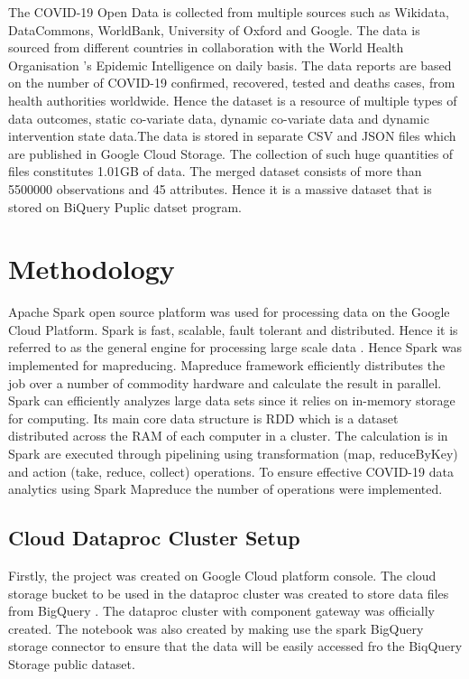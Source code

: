 \documentclass[12pt,letterpaper, twoside]{article}
\begin{document}
The COVID-19 Open Data is collected from multiple sources such as Wikidata, DataCommons, WorldBank, University of Oxford and Google. The data is sourced from different countries in collaboration with the World Health Organisation 's Epidemic Intelligence on daily basis. The data reports are based on the number of COVID-19  confirmed, recovered, tested and deaths cases, from health authorities worldwide. Hence the dataset is a resource of multiple types of data outcomes, static co-variate data, dynamic co-variate data and dynamic intervention state data\cite{covid-19}.The data is stored in separate CSV and JSON files which are published in Google Cloud Storage. The collection of such huge quantities of files constitutes 1.01GB of data.  The merged dataset consists of more than 5500000 observations and 45 attributes. Hence it is a massive dataset that is stored on BiQuery Puplic datset program.


\section{Methodology}
Apache Spark open source platform was used for processing data on the Google Cloud Platform. Spark is fast, scalable, fault tolerant and distributed. Hence it is referred to as the general engine for processing large scale data  \cite{Chouksey and Chauhan, 2017}. Hence Spark was implemented for mapreducing. Mapreduce framework efficiently distributes the job over a number of commodity hardware and calculate the result in parallel. Spark can efficiently analyzes large data sets since it relies on in-memory storage for computing. Its main core data structure is RDD which is a dataset distributed across the RAM  of each computer in a cluster. The calculation is in Spark are executed through pipelining using transformation (map, reduceByKey) and action (take, reduce, collect) operations. To ensure effective COVID-19 data analytics using Spark Mapreduce the number of operations were implemented.

\subsection{Cloud Dataproc Cluster Setup}
Firstly, the project was created on Google Cloud platform console. The cloud storage bucket to be used in the dataproc cluster was created to store data files from BigQuery . The dataproc cluster with component gateway was officially created. The notebook was also created by making use the spark BigQuery storage connector to ensure that the data will be easily accessed fro the BiqQuery Storage public dataset. 
\end{document}
